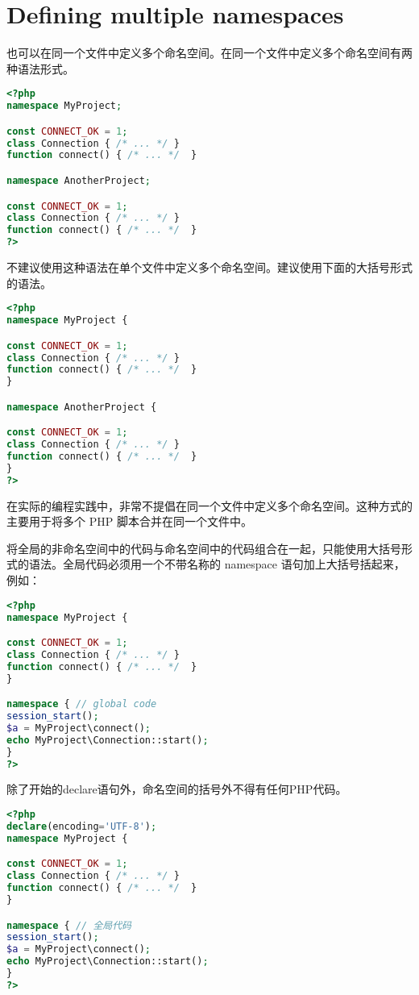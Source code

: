 \chapter{Defining multiple namespaces}

也可以在同一个文件中定义多个命名空间。在同一个文件中定义多个命名空间有两种语法形式。

\begin{lstlisting}[language=PHP]
<?php
namespace MyProject;

const CONNECT_OK = 1;
class Connection { /* ... */ }
function connect() { /* ... */  }

namespace AnotherProject;

const CONNECT_OK = 1;
class Connection { /* ... */ }
function connect() { /* ... */  }
?>
\end{lstlisting}

不建议使用这种语法在单个文件中定义多个命名空间。建议使用下面的大括号形式的语法。


\begin{lstlisting}[language=PHP]
<?php
namespace MyProject {

const CONNECT_OK = 1;
class Connection { /* ... */ }
function connect() { /* ... */  }
}

namespace AnotherProject {

const CONNECT_OK = 1;
class Connection { /* ... */ }
function connect() { /* ... */  }
}
?>
\end{lstlisting}

在实际的编程实践中，非常不提倡在同一个文件中定义多个命名空间。这种方式的主要用于将多个 PHP 脚本合并在同一个文件中。

将全局的非命名空间中的代码与命名空间中的代码组合在一起，只能使用大括号形式的语法。全局代码必须用一个不带名称的 namespace 语句加上大括号括起来，例如：


\begin{lstlisting}[language=PHP]
<?php
namespace MyProject {

const CONNECT_OK = 1;
class Connection { /* ... */ }
function connect() { /* ... */  }
}

namespace { // global code
session_start();
$a = MyProject\connect();
echo MyProject\Connection::start();
}
?>
\end{lstlisting}

除了开始的declare语句外，命名空间的括号外不得有任何PHP代码。


\begin{lstlisting}[language=PHP]
<?php
declare(encoding='UTF-8');
namespace MyProject {

const CONNECT_OK = 1;
class Connection { /* ... */ }
function connect() { /* ... */  }
}

namespace { // 全局代码
session_start();
$a = MyProject\connect();
echo MyProject\Connection::start();
}
?>
\end{lstlisting}







